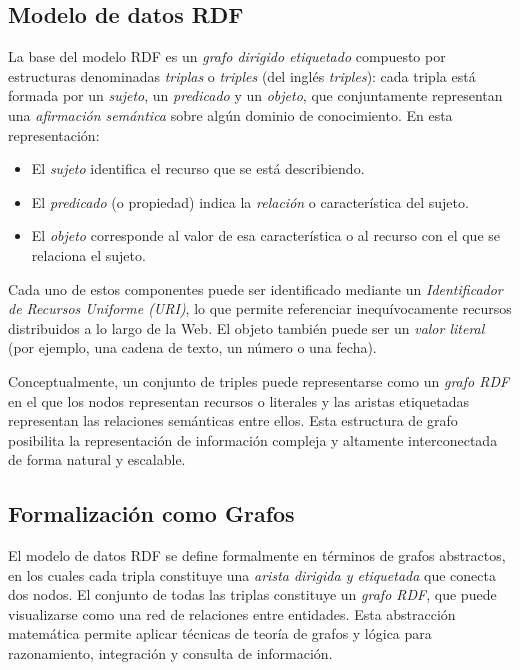 \documentclass{article}
\begin{document}
\subsection{Modelo de datos RDF}

La base del modelo RDF es un \textit{grafo dirigido etiquetado} compuesto por estructuras denominadas \textit{triplas} o \textit{triples} (del inglés \textit{triples}): cada tripla está formada por un \textit{sujeto}, un \textit{predicado} y un \textit{objeto}, que conjuntamente representan una \textit{afirmación semántica} sobre algún dominio de conocimiento. En esta representación:

\begin{itemize}
    \item El \textit{sujeto} identifica el recurso que se está describiendo.
    \item El \textit{predicado} (o propiedad) indica la \textit{relación} o característica del sujeto.
    \item El \textit{objeto} corresponde al valor de esa característica o al recurso con el que se relaciona el sujeto.
\end{itemize}

Cada uno de estos componentes puede ser identificado mediante un \textit{Identificador de Recursos Uniforme (URI)}, lo que permite referenciar inequívocamente recursos distribuidos a lo largo de la Web. El objeto también puede ser un \textit{valor literal} (por ejemplo, una cadena de texto, un número o una fecha).

Conceptualmente, un conjunto de triples puede representarse como un \textit{grafo RDF} en el que los nodos representan recursos o literales y las aristas etiquetadas representan las relaciones semánticas entre ellos. Esta estructura de grafo posibilita la representación de información compleja y altamente interconectada de forma natural y escalable.

\subsection{Formalización como Grafos}

El modelo de datos RDF se define formalmente en términos de grafos abstractos, en los cuales cada tripla constituye una \textit{arista dirigida y etiquetada} que conecta dos nodos. El conjunto de todas las triplas constituye un \textit{grafo RDF}, que puede visualizarse como una red de relaciones entre entidades. Esta abstracción matemática permite aplicar técnicas de teoría de grafos y lógica para razonamiento, integración y consulta de información.
\end{document}

